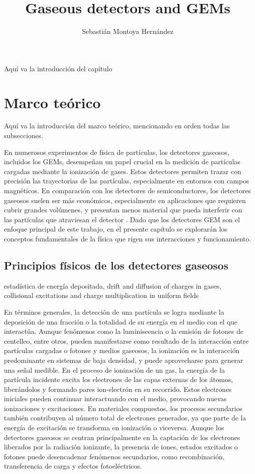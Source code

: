 \documentclass{article}
\title{\textbf{Gaseous detectors and GEMs} }
\author{Sebastián Montoya Hernández}
\begin{document}
\maketitle 
\setcounter{section}{0}
Aquí va la introducción del capítulo
\newpage
\section{Marco teórico}

Aquí va la introducción del marco teórico, mencionando en orden todas las subsecciones.

En numerosos experimentos de física de partículas, los detectores gaseosos, incluidos los GEMs, desempeñan un papel crucial en la medición de partículas cargadas mediante la ionización de gases. Estos detectores permiten trazar con precisión las trayectorias de las partículas, especialmente en entornos con campos magnéticos. En comparación con los detectores de semiconductores, los detectores gaseosos suelen ser más económicos, especialmente en aplicaciones que requieren cubrir grandes volúmenes, y presentan menos material que pueda interferir con las partículas que atraviesan el detector \cite{sauli2015gaseous}. Dado que los detectores GEM son el enfoque principal de este trabajo, en el presente capítulo se explorarán los conceptos fundamentales de la física que rigen sus interacciones y funcionamiento.

\subsection{Principios físicos de los detectores gaseosos}
estadística de energía depositada, drift and diffusion of charges in gases, collisional excitations and charge multiplication in uniform fields

\noindent En términos generales, la detección de una partícula se logra mediante la deposición de una fracción o la totalidad de su energía en el medio con el que interactúa. Aunque fenómenos como la luminiscencia o la emisión de fotones de centelleo, entre otros, pueden manifestarse como resultado de la interacción entre partículas cargadas o fotones y medios gaseosos, la ionización es la interacción predominante en sistemas de baja densidad, y puede aprovecharse para generar una señal medible. En el proceso de ionización de un gas, la energía de la partícula incidente excita los electrones de las capas externas de los átomos, liberándolos y formando pares ion-electrón en su recorrido. Estos electrones iniciales pueden continuar interactuando con el medio, provocando nuevas ionizaciones y excitaciones. En materiales compuestos, los procesos secundarios también contribuyen al número total de electrones generados, ya que parte de la energía de excitación se transforma en ionización o viceversa. Aunque los detectores gaseosos se centran principalmente en la captación de los electrones liberados por la radiación ionizante, la presencia de iones, estados excitados o fotones puede desencadenar fenómenos secundarios, como recombinación, transferencia de carga y efectos fotoeléctricos.\\
\end{document}
